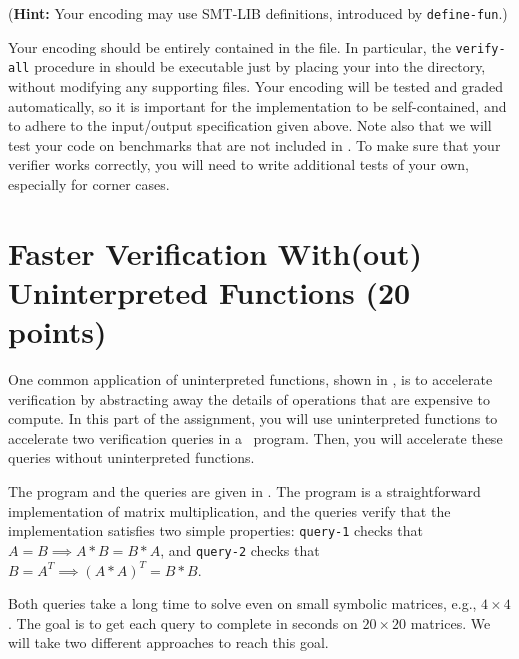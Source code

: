 \documentclass{handout}
\begin{document}
\begin{questions}
\medskip
(\textbf{Hint:}  Your encoding may use SMT-LIB definitions, introduced by \texttt{define-fun}.)
\medskip

Your encoding should be entirely contained in the  file.
In particular, the \texttt{verify-all} procedure in  should
be executable just by placing your  into the 
directory, without modifying any supporting files.  Your encoding will be tested
and graded automatically, so it is important for the implementation to be
self-contained, and to adhere to the input/output specification given above.
Note also that we will test your code on benchmarks that are not included in
.  To make sure that your verifier works correctly, you
will need to write additional tests of your own, especially for corner cases.   





\end{questions}


\section{Faster Verification With(out) Uninterpreted Functions (20 points)}

One common application of uninterpreted functions, shown in , is to
accelerate verification by abstracting away the details of operations that are
expensive to compute.  In this part of the assignment, you will use
uninterpreted functions to accelerate two verification queries in a \rosette\
program.  Then, you will accelerate these queries without uninterpreted
functions.

The program and the queries are given in .  The program is
a straightforward implementation of matrix multiplication, and the queries
verify that the implementation satisfies two simple properties: \texttt{query-1}
checks that $A = B \implies A*B = B*A$, and \texttt{query-2} checks that $B =
A^T \implies (A*A)^T = B*B$. 

Both queries take a long time to solve even on small symbolic matrices, e.g.,
$4\times4$.  The goal is to get each query to complete in seconds on
$20\times20$ matrices.  We will take two different approaches to reach this
goal.  
\end{document}
